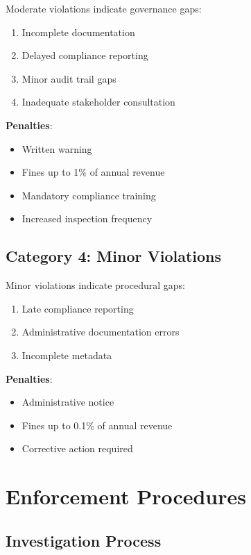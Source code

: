 \documentclass[12pt,a4paper,twoside,openright]{book}
\begin{document}
Moderate violations indicate governance gaps:

\begin{enumerate}
    \item Incomplete documentation
    \item Delayed compliance reporting
    \item Minor audit trail gaps
    \item Inadequate stakeholder consultation
\end{enumerate}

\textbf{Penalties}:
\begin{itemize}
    \item Written warning
    \item Fines up to 1\% of annual revenue
    \item Mandatory compliance training
    \item Increased inspection frequency
\end{itemize}

\subsection{Category 4: Minor Violations}

Minor violations indicate procedural gaps:

\begin{enumerate}
    \item Late compliance reporting
    \item Administrative documentation errors
    \item Incomplete metadata
\end{enumerate}

\textbf{Penalties}:
\begin{itemize}
    \item Administrative notice
    \item Fines up to 0.1\% of annual revenue
    \item Corrective action required
\end{itemize}

\section{Enforcement Procedures}

\subsection{Investigation Process}
\end{document}
